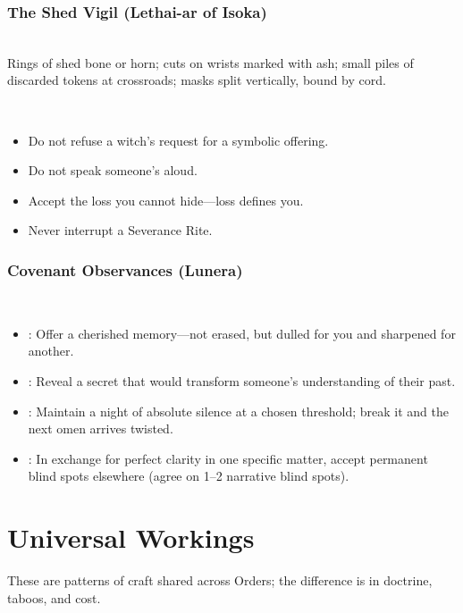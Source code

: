 \subsubsection{The Shed Vigil (Lethai-ar of Isoka)}
\begin{RiteBox}
\\
Rings of shed bone or horn; cuts on wrists marked with ash; small piles of discarded tokens at crossroads; masks split vertically, bound by cord.
\medskip

\\
\begin{itemize}
  \item Do not refuse a witch's request for a symbolic offering.
  \item Do not speak someone's  aloud.
  \item Accept the loss you cannot hide---loss defines you.
  \item Never interrupt a Severance Rite.
\end{itemize}
\end{RiteBox}

\subsubsection{Covenant Observances (Lunera)}
\begin{RiteBox}
\\
\begin{itemize}
  \item {}: Offer a cherished memory---not erased, but dulled for you and sharpened for another.
  \item {}: Reveal a secret that would transform someone's understanding of their past.
  \item {}: Maintain a night of absolute silence at a chosen threshold; break it and the next omen arrives twisted.
  \item {}: In exchange for perfect clarity in one specific matter, accept permanent blind spots elsewhere (agree on 1--2 narrative blind spots).
\end{itemize}
\end{RiteBox}

\section{Universal Workings}
These are patterns of craft shared across Orders; the difference is in doctrine, taboos, and cost.

